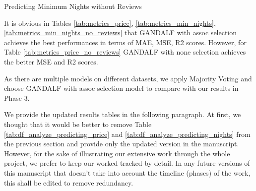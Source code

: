 \documentclass[a4paper,12pt]{article}
\begin{document}
\begin{table}[ht]
\centering
\begin{minipage}[t]{0.45\linewidth}
\centering
\small
{}
\caption{Predicting Minimum Nights without Reviews}
\label{tab:metrics_min_nights_no_reviews}
\end{minipage}%
\hfill
\begin{minipage}[t]{0.45\linewidth}
\centering
\small
{}
\caption{Predicting Price without Reviews}
\label{tab:metrics_price_no_reviews}
\end{minipage}
\end{table}

It is obvious in Tables \ref{tab:metrics_price}, \ref{tab:metrics_min_nights}, \ref{tab:metrics_min_nights_no_reviews} that GANDALF with assoc selection achieves the best performances in terms of MAE, MSE, R2 scores. However, for Table \ref{tab:metrics_price_no_reviews} GANDALF with none selection achieves the better MSE and R2 scores.

As there are multiple models on different datasets, we apply Majority Voting and choose GANDALF with assoc selection model to compare with our results in Phase 3.

We provide the updated results tables in the following paragraph. At first, we thought that it would be better to remove Table \ref{tab:df_analyze_predicting_price} and \ref{tab:df_analyze_predicting_nights} from the previous section and provide only the updated version in the manuscript. However, for the sake of illustrating our extensive work through the whole project, we prefer to keep our worked tracked by detail. In any future versions of this manuscript that doesn't take into account the timeline (phases) of the work, this shall be edited to remove redundancy.
\end{document}
